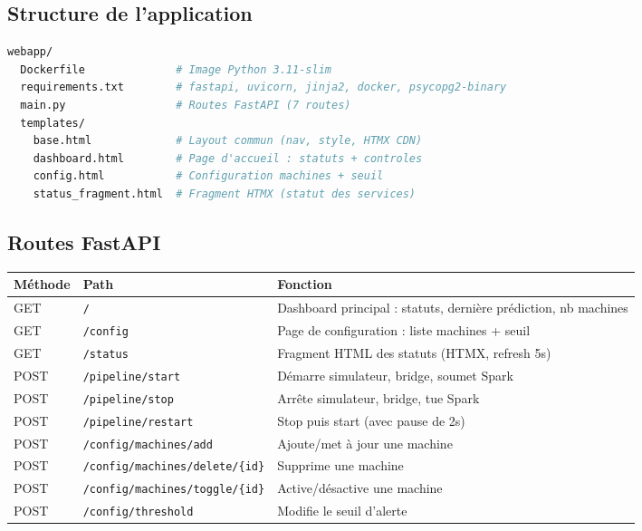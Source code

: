 \documentclass[12pt,a4paper]{article}
\begin{document}
\subsection{Structure de l'application}

\begin{lstlisting}[language=bash,caption={Arborescence de l'interface web}]
webapp/
  Dockerfile              # Image Python 3.11-slim
  requirements.txt        # fastapi, uvicorn, jinja2, docker, psycopg2-binary
  main.py                 # Routes FastAPI (7 routes)
  templates/
    base.html             # Layout commun (nav, style, HTMX CDN)
    dashboard.html        # Page d'accueil : statuts + controles
    config.html           # Configuration machines + seuil
    status_fragment.html  # Fragment HTMX (statut des services)
\end{lstlisting}

\subsection{Routes FastAPI}

\begin{center}
\small
\begin{tabular}{|l|l|l|}
\hline
\textbf{Méthode} & \textbf{Path} & \textbf{Fonction} \\
\hline
GET & \texttt{/} & Dashboard principal : statuts, dernière prédiction, nb machines \\
GET & \texttt{/config} & Page de configuration : liste machines + seuil \\
GET & \texttt{/status} & Fragment HTML des statuts (HTMX, refresh 5s) \\
POST & \texttt{/pipeline/start} & Démarre simulateur, bridge, soumet Spark \\
POST & \texttt{/pipeline/stop} & Arrête simulateur, bridge, tue Spark \\
POST & \texttt{/pipeline/restart} & Stop puis start (avec pause de 2s) \\
POST & \texttt{/config/machines/add} & Ajoute/met à jour une machine \\
POST & \texttt{/config/machines/delete/\{id\}} & Supprime une machine \\
POST & \texttt{/config/machines/toggle/\{id\}} & Active/désactive une machine \\
POST & \texttt{/config/threshold} & Modifie le seuil d'alerte \\
\hline
\end{tabular}
\end{center}
\end{document}
